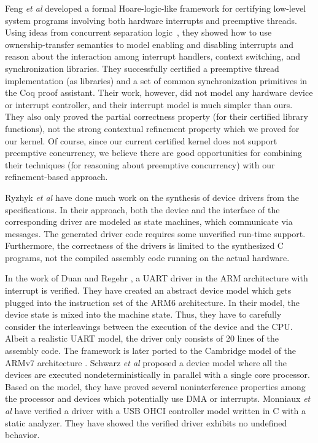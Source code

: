 Feng {\em et al} \cite{feng08:aim,feng09:jar} developed a formal Hoare-logic-like
framework for certifying low-level system programs involving both
hardware interrupts and preemptive threads.  Using ideas from
concurrent separation logic~\cite{ohearn:concur04}, they showed how to
use ownership-transfer semantics to model enabling and disabling
interrupts and reason about the interaction among interrupt handlers,
context switching, and synchronization libraries.  They successfully
certified a preemptive thread implementation (as libraries) and a set
of common synchronization primitives in the Coq proof assistant.
Their work, however, did not model any hardware device or interrupt
controller, and their interrupt model is much simpler than ours. They
also only proved the partial correctness property (for their certified
library functions), not the strong contextual refinement property
which we proved for our kernel. Of course, since our current certified
kernel does not support preemptive concurrency, we believe there are
good opportunities for combining their techniques (for reasoning about
preemptive concurrency) with our refinement-based approach.

Ryzhyk {\em et al} \cite{Ryzhyk_09,Ryzhyk14} have done much work on
the synthesis of device drivers from the specifications.
In their approach, both the device and the interface of the corresponding
driver are modeled as state machines, which communicate via messages. 
The generated driver code requires some unverified run-time
support. Furthermore, the correctness of the drivers is limited to the
synthesized C programs, not the compiled assembly code running on the actual
hardware. 

In the work of Duan and Regehr \cite{Duan2010}, a UART driver in the
ARM architecture with interrupt is verified. They have created an
abstract device model which gets plugged into the instruction set of
the ARM6 architecture.  In their model, the device state is mixed into
the machine state. Thus, they have to carefully consider the
interleavings between the execution of the device and the CPU. Albeit
a realistic UART model, the driver only consists of 20 lines of the
assembly code. The framework is later ported to the Cambridge model of
the ARMv7 architecture \cite{duan2013}.  Schwarz {\em et al}
\cite{Oliver2014} proposed a device model where all the devices are
executed nondeterministically in parallel with a single core
processor. Based on the model, they have proved several
noninterference properties among the processor and devices which
potentially use DMA or interrupts.  Monniaux {\em et al}
\cite{Monniaux_EMSOFT07} have verified a driver with a USB OHCI
controller model written in C with a static analyzer.  They have
showed the verified driver exhibits no undefined behavior.


